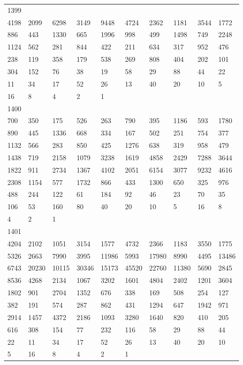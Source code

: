 \begin{longtable}{*{10}{l}}
1399&&&&&&&&&\\
4198& 2099& 6298& 3149& 9448& 4724& 2362& 1181& 3544& 1772\\
886& 443& 1330& 665& 1996& 998& 499& 1498& 749& 2248\\
1124& 562& 281& 844& 422& 211& 634& 317& 952& 476\\
238& 119& 358& 179& 538& 269& 808& 404& 202& 101\\
304& 152& 76& 38& 19& 58& 29& 88& 44& 22\\
11& 34& 17& 52& 26& 13& 40& 20& 10& 5\\
16& 8& 4& 2& 1& \\

1400&&&&&&&&&\\
700& 350& 175& 526& 263& 790& 395& 1186& 593& 1780\\
890& 445& 1336& 668& 334& 167& 502& 251& 754& 377\\
1132& 566& 283& 850& 425& 1276& 638& 319& 958& 479\\
1438& 719& 2158& 1079& 3238& 1619& 4858& 2429& 7288& 3644\\
1822& 911& 2734& 1367& 4102& 2051& 6154& 3077& 9232& 4616\\
2308& 1154& 577& 1732& 866& 433& 1300& 650& 325& 976\\
488& 244& 122& 61& 184& 92& 46& 23& 70& 35\\
106& 53& 160& 80& 40& 20& 10& 5& 16& 8\\
4& 2& 1& \\

1401&&&&&&&&&\\
4204& 2102& 1051& 3154& 1577& 4732& 2366& 1183& 3550& 1775\\
5326& 2663& 7990& 3995& 11986& 5993& 17980& 8990& 4495& 13486\\
6743& 20230& 10115& 30346& 15173& 45520& 22760& 11380& 5690& 2845\\
8536& 4268& 2134& 1067& 3202& 1601& 4804& 2402& 1201& 3604\\
1802& 901& 2704& 1352& 676& 338& 169& 508& 254& 127\\
382& 191& 574& 287& 862& 431& 1294& 647& 1942& 971\\
2914& 1457& 4372& 2186& 1093& 3280& 1640& 820& 410& 205\\
616& 308& 154& 77& 232& 116& 58& 29& 88& 44\\
22& 11& 34& 17& 52& 26& 13& 40& 20& 10\\
5& 16& 8& 4& 2& 1& \\


\end{longtable}
